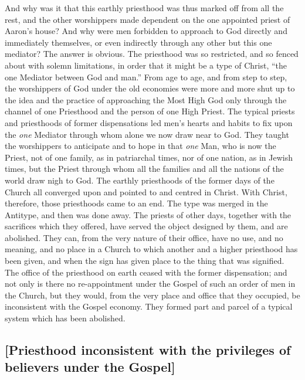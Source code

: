 \documentclass[
]{book}
\begin{document}
And why was it that this earthly priesthood was thus marked off from all the rest, and the other worshippers made dependent on the one appointed priest of Aaron's house? And why were men forbidden to approach to God directly and immediately themselves, or even indirectly through any other but this one mediator? The answer is obvious. The priesthood was so restricted, and so fenced about with solemn limitations, in order that it might be a type of Christ, ``the one Mediator between God and man.'' From age to age, and from step to step, the worshippers of God under the old economies were more and more shut up to the idea and the practice of approaching the Most High God only through the channel of one Priesthood and the person of one High Priest. The typical priests and priesthoods of former dispensations led men's hearts and habits to fix upon the \emph{one} Mediator through whom alone we now draw near to God. They taught the worshippers to anticipate and to hope in that \emph{one} Man, who is now the Priest, not of one family, as in patriarchal times, nor of one nation, as in Jewish times, but the Priest through whom all the families and all the nations of the world draw nigh to God. The earthly priesthoods of the former days of the Church all converged upon and pointed to and centred in Christ. With Christ, therefore, those priesthoods came to an end. The type was merged in the Antitype, and then was done away. The priests of other days, together with the sacrifices which they offered, have served the object designed by them, and are abolished. They can, from the very nature of their office, have no use, and no meaning, and no place in a Church to which another and a higher priesthood has been given, and when the sign has given place to the thing that was signified. The office of the priesthood on earth ceased with the former dispensation; and not only is there no re-appointment under the Gospel of such an order of men in the Church, but they would, from the very place and office that they occupied, be inconsistent with the Gospel economy. They formed part and parcel of a typical system which has been abolished.

\hypertarget{priesthood-inconsistent-with-the-privileges-of-believers-under-the-gospel}{%
\subsection{{[}Priesthood inconsistent with the privileges of believers under the Gospel{]}}\label{priesthood-inconsistent-with-the-privileges-of-believers-under-the-gospel}}
\end{document}
